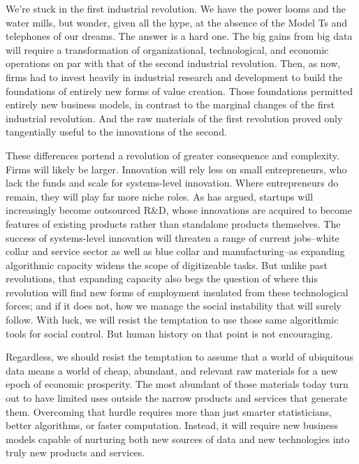 \documentclass[12pt]{article}
\begin{document}
We're stuck in the first industrial revolution. We have the power
looms and the water mills, but wonder, given all the hype, at the
absence of the Model Ts and telephones of our dreams. The answer is a
hard one. The big gains from big data will require a transformation of
organizational, technological, and economic operations on par with
that of the second industrial revolution. Then, as now, firms had to
invest heavily in industrial research and development to build the
foundations of entirely new forms of value creation. Those foundations
permitted entirely new business models, in contrast to the marginal
changes of the first industrial revolution. And the raw materials of
the first revolution proved only tangentially useful to the
innovations of the second.

These differences portend a revolution of greater consequence and
complexity. Firms will likely be larger. Innovation will rely less on
small entrepreneurs, who lack the funds and scale for systems-level
innovation. Where entrepreneurs do remain, they will play far more
niche roles. As \cite{rao2012} has argued, startups will increasingly
become outsourced R\&D, whose innovations are acquired to become
features of existing products rather than standalone products
themselves. The success of systems-level innovation will threaten a
range of current jobs--white collar and service sector as well as blue
collar and manufacturing--as expanding algorithmic capacity widens the
scope of digitizeable tasks. But unlike past revolutions, that
expanding capacity also begs the question of where this revolution
will find new forms of employment insulated from these technological
forces; and if it does not, how we manage the social instability that
will surely follow. With luck, we will resist the temptation to use
those same algorithmic tools for social control. But human history on
that point is not encouraging.

Regardless, we should resist the temptation to assume that a world of
ubiquitous data means a world of cheap, abundant, and relevant raw
materials for a new epoch of economic prosperity. The most abundant of
those materials today turn out to have limited uses outside the narrow
products and services that generate them. Overcoming that hurdle
requires more than just smarter statisticians, better algorithms, or
faster computation. Instead, it will require new business models
capable of nurturing both new sources of data and new technologies
into truly new products and services. 




\end{document}
